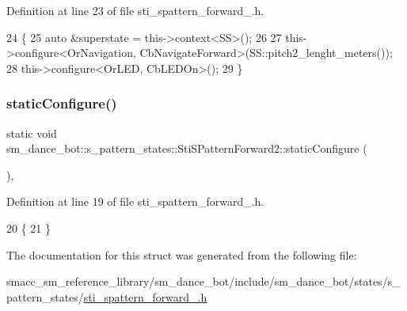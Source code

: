 Definition at line 23 of file sti\+\_\+spattern\+\_\+forward\+\_.\+h.


\begin{DoxyCode}
24   \{
25     \textcolor{keyword}{auto} &superstate = this->context<SS>();
26 
27     this->configure<OrNavigation, CbNavigateForward>(SS::pitch2\_lenght\_meters());
28     this->configure<OrLED, CbLEDOn>();
29   \}
\end{DoxyCode}
\mbox{\label{structsm__dance__bot_1_1s__pattern__states_1_1StiSPatternForward2_a33640741652be87e2fcb2758e33e6039}} 
\subsubsection{\texorpdfstring{static\+Configure()}{staticConfigure()}}
{\footnotesize\ttfamily static void sm\+\_\+dance\+\_\+bot\+::s\+\_\+pattern\+\_\+states\+::\+Sti\+S\+Pattern\+Forward2\+::static\+Configure (\begin{DoxyParamCaption}{ }\end{DoxyParamCaption})\hspace{0.3cm}{\ttfamily [inline]}, {\ttfamily [static]}}



Definition at line 19 of file sti\+\_\+spattern\+\_\+forward\+\_.\+h.


\begin{DoxyCode}
20   \{
21   \}
\end{DoxyCode}


The documentation for this struct was generated from the following file\+:\begin{DoxyCompactItemize}
\item 
smacc\+\_\+sm\+\_\+reference\+\_\+library/sm\+\_\+dance\+\_\+bot/include/sm\+\_\+dance\+\_\+bot/states/s\+\_\+pattern\+\_\+states/\hyperlink{include_2sm__dance__bot_2states_2s__pattern__states_2sti__spattern__forward__2_8h}{sti\+\_\+spattern\+\_\+forward\+\_.\+h}\end{DoxyCompactItemize}
